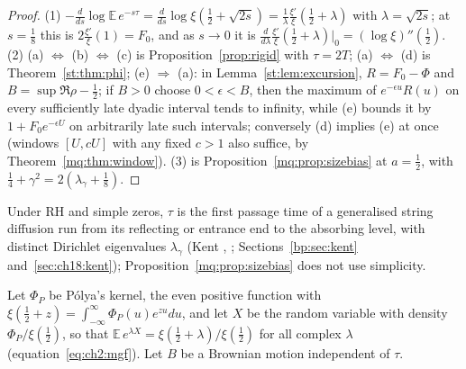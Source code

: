 \begin{proof}
(1) $-\frac d{ds}\log\mathbb E\,e^{-s\tau}=\frac d{ds}\log\xi(\frac12+\sqrt{2s})=\frac1\lambda\frac{\xi'}\xi(\frac12+\lambda)$ with $\lambda=\sqrt{2s}$; at $s=\frac18$ this is $2\frac{\xi'}\xi(1)=F_0$, and as $s\to0$ it is $\frac d{d\lambda}\frac{\xi'}\xi(\frac12+\lambda)|_0=(\log\xi)''(\frac12)$. (2) (a) $\Leftrightarrow$ (b) $\Leftrightarrow$ (c) is Proposition~\ref{prop:rigid} with $\tau=2T$; (a) $\Leftrightarrow$ (d) is Theorem~\ref{st:thm:phi}; (e) $\Rightarrow$ (a): in Lemma~\ref{st:lem:excursion}, $R=F_0-\Phi$ and $B=\sup\Re\rho-\frac12$; if $B>0$ choose $0<\epsilon<B$, then the maximum of $e^{-\epsilon u}R(u)$ on every sufficiently late dyadic interval tends to infinity, while (e) bounds it by $1+F_0e^{-\epsilon U}$ on arbitrarily late such intervals; conversely (d) implies (e) at once (windows $[U,cU]$ with any fixed $c>1$ also suffice, by Theorem~\ref{mq:thm:window}). (3) is Proposition~\ref{mq:prop:sizebias} at $a=\frac12$, with $\frac14+\gamma^2=2(\lambda_\gamma+\frac18)$.
\end{proof}

Under RH and simple zeros, $\tau$ is the first passage time of a generalised string diffusion run from its reflecting or entrance end to the absorbing level, with distinct Dirichlet eigenvalues $\lambda_\gamma$ (Kent \cite{Kent80}, \cite{Kent82}; Sections~\ref{bp:sec:kent} and~\ref{sec:ch18:kent}); Proposition~\ref{mq:prop:sizebias} does not use simplicity.

Let $\Phi_P$ be P\'olya's kernel, the even positive function with $\xi(\frac12+z)=\int_{-\infty}^\infty\Phi_P(u)e^{zu}du$, and let $X$ be the random variable with density $\Phi_P/\xi(\frac12)$, so that $\mathbb E\,e^{\lambda X}=\xi(\frac12+\lambda)/\xi(\frac12)$ for all complex $\lambda$ (equation~\eqref{eq:ch2:mgf}). Let $B$ be a Brownian motion independent of $\tau$.

